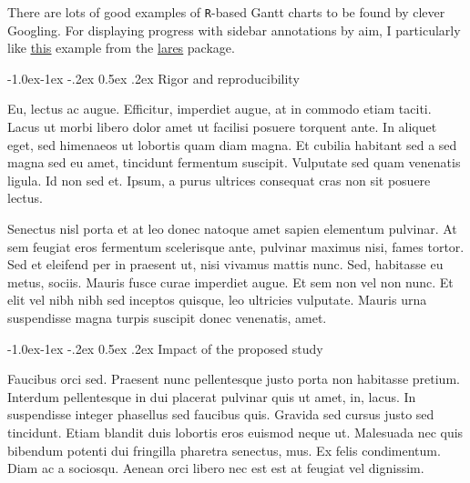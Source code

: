 \documentclass[11pt,]{article}
\makeatletter
\renewcommand\subsubsection{
  \@startsection{subsubsection}{3}{\z@}
    {-1.0ex\@plus -1ex \@minus -.2ex}%
    {0.5ex \@plus .2ex}%
    {\normalfont\normalsize\bf}} %
\makeatother
\begin{document}
There are lots of good examples of \texttt{R}-based Gantt charts to be
found by clever Googling. For displaying progress with sidebar
annotations by aim, I particularly like
\href{https://datascienceplus.com/visualize-your-cvs-timeline-with-r-gantt-style/}{\underline{this}}
example from the
\href{https://github.com/laresbernardo/lares}{\underline{lares}}
package.

\hypertarget{rigor-and-reproducibility}{%
\subsubsection{Rigor and
reproducibility}\label{rigor-and-reproducibility}}

Eu, lectus ac augue. Efficitur, imperdiet augue, at in commodo etiam
taciti. Lacus ut morbi libero dolor amet ut facilisi posuere torquent
ante. In aliquet eget, sed himenaeos ut lobortis quam diam magna. Et
cubilia habitant sed a sed magna sed eu amet, tincidunt fermentum
suscipit. Vulputate sed quam venenatis ligula. Id non sed et. Ipsum, a
purus ultrices consequat cras non sit posuere lectus.

Senectus nisl porta et at leo donec natoque amet sapien elementum
pulvinar. At sem feugiat eros fermentum scelerisque ante, pulvinar
maximus nisi, fames tortor. Sed et eleifend per in praesent ut, nisi
vivamus mattis nunc. Sed, habitasse eu metus, sociis. Mauris fusce curae
imperdiet augue. Et sem non vel non nunc. Et elit vel nibh nibh sed
inceptos quisque, leo ultricies vulputate. Mauris urna suspendisse magna
turpis suscipit donec venenatis, amet.

\hypertarget{impact-of-the-proposed-study}{%
\subsubsection{Impact of the proposed
study}\label{impact-of-the-proposed-study}}

Faucibus orci sed. Praesent nunc pellentesque justo porta non habitasse
pretium. Interdum pellentesque in dui placerat pulvinar quis ut amet,
in, lacus. In suspendisse integer phasellus sed faucibus quis. Gravida
sed cursus justo sed tincidunt. Etiam blandit duis lobortis eros euismod
neque ut. Malesuada nec quis bibendum potenti dui fringilla pharetra
senectus, mus. Ex felis condimentum. Diam ac a sociosqu. Aenean orci
libero nec est est at feugiat vel dignissim.


\end{document}
